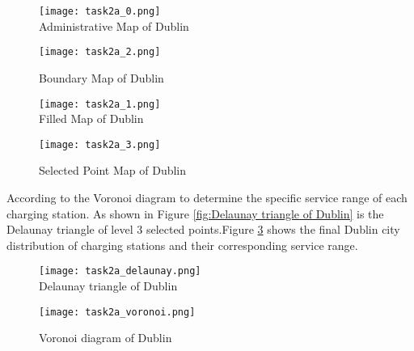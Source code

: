 \documentclass{mcmthesis}
\begin{document}
\begin{figure}[htbp]  
\begin{minipage}[t]{0.5\textwidth}
\centering  
\texttt{[image: task2a\_0.png]} \\
\caption{Administrative Map of Dublin} \label{fig:administrative map of Dublin}
\end{minipage}
\hspace{1ex}
\begin{minipage}[t]{0.5\textwidth}  
\centering  
\texttt{[image: task2a\_2.png]}\\
\caption{Boundary Map of Dublin}  \label{fig:Boundary Map of Dublin}
\end{minipage}  
\end{figure} 

\begin{figure}[htbp]  
\begin{minipage}[t]{0.5\textwidth}
\centering  
\texttt{[image: task2a\_1.png]} \\
\caption{Filled Map of Dublin} \label{fig:Filled Map of Dublin}
\end{minipage}
\hspace{1ex}
\begin{minipage}[t]{0.5\textwidth}  
\centering  
\texttt{[image: task2a\_3.png]}\\
\caption{Selected Point Map of Dublin}  \label{fig:Selected Point Map of Dublin}
\end{minipage}  
\end{figure} 


\par According to the Voronoi diagram to determine the specific service range of each charging station. As shown in Figure \ref{fig:Delaunay triangle of Dublin} is the Delaunay triangle of level 3 selected points.Figure \ref{fig:Voronoi diagram of Dublin} shows the final Dublin city distribution of charging stations and their corresponding service range.

\begin{figure}[htbp]  
\begin{minipage}[t]{0.5\textwidth}
\centering  
\texttt{[image: task2a\_delaunay.png]} \\
\caption{Delaunay triangle of Dublin} \label{fig:Delaunay triangle of Dublin}
\end{minipage}
\hspace{1ex}
\begin{minipage}[t]{0.5\textwidth}  
\centering  
\texttt{[image: task2a\_voronoi.png]}\\
\caption{Voronoi diagram of Dublin}  \label{fig:Voronoi diagram of Dublin}
\end{minipage}  
\end{figure} 
\end{document}
